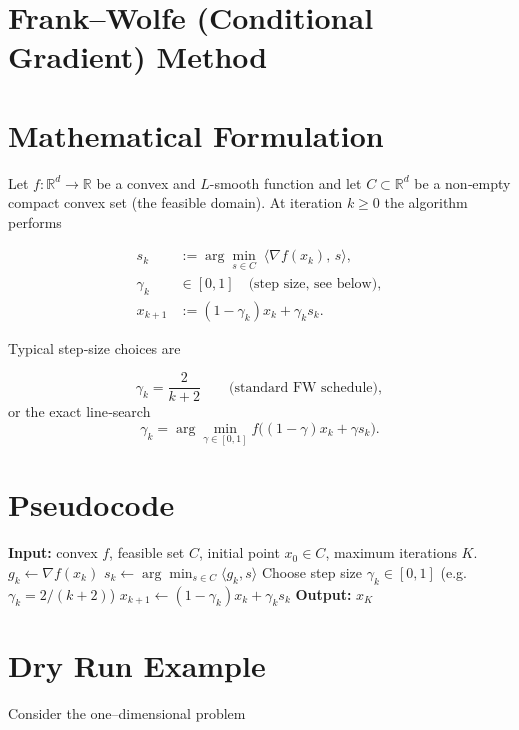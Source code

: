 \documentclass{article}
\begin{document}
\section*{Frank–Wolfe (Conditional Gradient) Method}

\section*{Mathematical Formulation}
Let $f:\mathbb{R}^d\rightarrow\mathbb{R}$ be a convex and $L$-smooth function and let 
$C\subset\mathbb{R}^d$ be a non‑empty compact convex set (the feasible domain).  
At iteration $k\ge 0$ the algorithm performs

\[
\begin{aligned}
s_k &:= \arg\min_{s\in C}\;\langle \nabla f(x_k),\,s\rangle , \tag{1}\\[4pt]
\gamma_k &\in[0,1] \quad\text{(step size, see below)},\\[4pt]
x_{k+1} &:= (1-\gamma_k)x_k + \gamma_k s_k . \tag{2}
\end{aligned}
\]

Typical step‑size choices are  

\[
\gamma_k = \frac{2}{k+2}\qquad\text{(standard FW schedule)},
\]
or the exact line‑search
\[
\gamma_k = \arg\min_{\gamma\in[0,1]} f\bigl((1-\gamma)x_k+\gamma s_k\bigr).
\]

\section*{Pseudocode}
\begin{algorithm}[H]
\caption{Frank–Wolfe}
\begin{algorithmic}[1]
\STATE \textbf{Input:} convex $f$, feasible set $C$, initial point $x_0\in C$, 
maximum iterations $K$.
    \STATE $g_k \gets \nabla f(x_k)$
    \STATE $s_k \gets \displaystyle\arg\min_{s\in C}\langle g_k,s\rangle$ \hfill{}
    \STATE Choose step size $\gamma_k\in[0,1]$ (e.g. $\gamma_k=2/(k+2)$)
    \STATE $x_{k+1} \gets (1-\gamma_k)x_k + \gamma_k s_k$
\ENDFOR
\STATE \textbf{Output:} $x_K$
\end{algorithmic}
\end{algorithm}

\section*{Dry Run Example}
Consider the one–dimensional problem  
\end{document}
